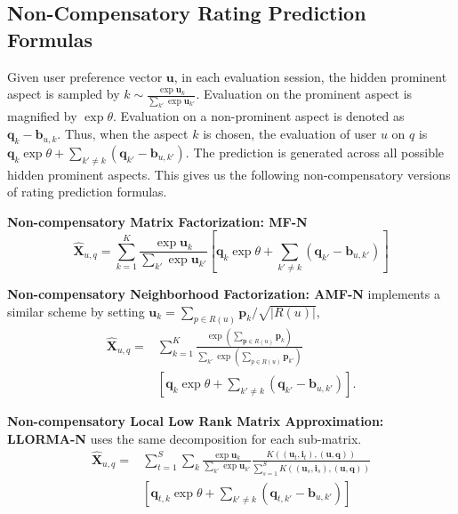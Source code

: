 \documentclass[letterpaper]{article} %
\newcommand{\Rating}{\mathbf{X}}
\begin{document}
\subsection{Non-Compensatory Rating Prediction Formulas}
Given user preference vector $\mathbf{u}$, in each evaluation session, the hidden prominent aspect is sampled by $k\sim \frac{\exp \mathbf{u}_k}{\sum_{k'} \exp \mathbf{u}_{k'}} $. Evaluation on the prominent aspect is magnified by  $\exp \theta$. Evaluation on a non-prominent aspect is denoted as $\mathbf{q}_k-\mathbf{b}_{u,k}$. Thus, when the aspect $k$ is chosen, the evaluation of user $u$ on $q$ is $\mathbf{q}_k \exp\theta  + \sum_{k'\neq k} (\mathbf{q}_{k'}-\mathbf{b}_{u,k'})$. The prediction is generated across all possible hidden prominent aspects. This gives us the following non-compensatory versions of rating prediction formulas.

\textbf{Non-compensatory Matrix Factorization: MF-N} 
\begin{equation}\label{equ:MF-N}
 \hat{\mathbf{X}}_{u,q}=\sum_{k=1}^{K} \frac{\exp \mathbf{u}_k}{\sum_{k'} \exp \mathbf{u}_{k'}} [ \mathbf{q}_k  \exp\theta  + \sum_{k'\neq k} (\mathbf{q}_{k'}-\mathbf{b}_{u,k'}) ]
\end{equation}


\textbf{Non-compensatory Neighborhood Factorization: AMF-N} implements a similar scheme by setting $\mathbf{u}_k =\sum_{p \in R(u)} \mathbf{p}_k/\sqrt{|R(u)|} $, 
\begin{eqnarray}\label{equ:AMF-N}
 \hat{\mathbf{X}}_{u,q}=&\sum_{k=1}^{K} \frac{\exp (\sum_{\mathbf{p} \in R(u)} \mathbf{p}_k )}{\sum_{k'} \exp  (\sum_{p \in R(u)} \mathbf{p}_{k'} ) } \\\nonumber
& [  \mathbf{q}_k \exp\theta + \sum_{k'\neq k} (\mathbf{q}_{k'}-\mathbf{b}_{u,k'}) ].
\end{eqnarray}

\textbf{Non-compensatory Local Low Rank Matrix Approximation: LLORMA-N} uses the same decomposition for each sub-matrix.  
\begin{eqnarray}\label{equ:LLORMA-N}
\hat{\Rating}_{u,q} = & \sum_{t=1}^{S} \sum_k  \frac{\exp \mathbf{u}_k}{\sum_{k'} \exp \mathbf{u}_{k'}}  \frac{K((\mathbf{u}_t,\mathbf{i}_t),(\mathbf{u},\mathbf{q}))}{\sum_{s=1}^{S} K((\mathbf{u}_s,\mathbf{i}_s),(\mathbf{u},\mathbf{q}))} \\\nonumber
& [ \mathbf{q}_{t,k} \exp\theta  + \sum_{k'\neq k} (\mathbf{q}_{t,k'}-\mathbf{b}_{u,k'}) ]
\end{eqnarray}
\end{document}
